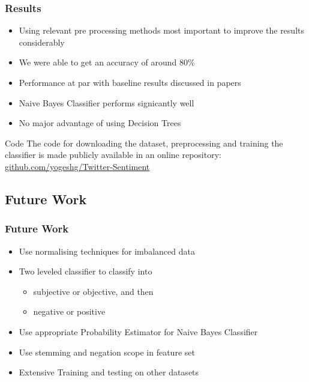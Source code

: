 \documentclass{beamer}
\begin{document}
\begin{frame}
\frametitle{Results}
\begin{itemize}
\item Using relevant pre processing methods most important to improve the results considerably
\item We were able to get an accuracy of around 80\%
\item Performance at par with baseline results discussed in papers
\item Naive Bayes Classifier performs signicantly well
\item No major advantage of using Decision Trees
\end{itemize}

\begin{block}{Code}
The code for downloading the dataset, preprocessing and training the classifier
is made publicly available in an online repository:\\
\href{https://github.com/yogeshg/Twitter-Sentiment}
{ github.com/yogeshg/Twitter-Sentiment}
\end{block}

\end{frame}
\subsection{Future Work}

\begin{frame}
\frametitle{Future Work}
\begin{itemize}
\item Use normalising techniques for imbalanced data %
\item Two leveled classifier to classify into %
	\begin{itemize}
		\item subjective or objective, and then
		\item negative or positive
	\end{itemize}
\item Use appropriate Probability Estimator for Naive Bayes Classifier
\item Use stemming and negation scope in feature set
\item Extensive Training and testing on other datasets
\end{itemize}
\end{frame}
\end{document}

